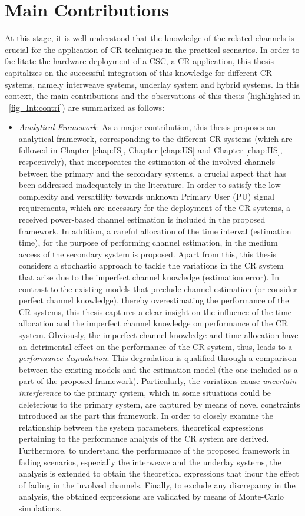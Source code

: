\section{Main Contributions}
At this stage, it is well-understood that the knowledge of the related channels is crucial for the application of CR techniques in the practical scenarios. In order to facilitate the hardware deployment of a CSC, a CR application, this thesis capitalizes on the successful integration of this knowledge for different CR systems, namely interweave systems, underlay system and hybrid systems. In this context, the main contributions and the observations of this thesis (highlighted in \figurename~\ref{fig_Int:contri}) are summarized as follows:
\begin{itemize}
\item \textit{Analytical Framework}: 
As a major contribution, this thesis proposes an analytical framework, corresponding to the different CR systems (which are followed in Chapter \ref{chap:IS}, Chapter \ref{chap:US} and Chapter \ref{chap:HS}, respectively), that incorporates the estimation of the involved channels between the primary and the secondary systems, a crucial aspect that has been addressed inadequately in the literature. In order to satisfy the low complexity and versatility towards unknown Primary User (PU) signal requirements, which are necessary for the deployment of the CR systems, a received power-based channel estimation is included in the proposed framework. In addition, a careful allocation of the time interval (estimation time), for the purpose of performing channel estimation, in the medium access of the secondary system is proposed. Apart from this, this thesis considers a stochastic approach to tackle the variations in the CR system that arise due to the imperfect channel knowledge (estimation error). In contrast to the existing models that preclude channel estimation (or consider perfect channel knowledge), thereby overestimating the performance of the CR systems, this thesis captures a clear insight on the influence of the time allocation and the imperfect channel knowledge on performance of the CR system. Obviously, the imperfect channel knowledge and time allocation have an detrimental effect on the performance of the CR system, thus, leads to a \textit{performance degradation}. This degradation is qualified through a comparison between the existing models and the estimation model (the one included as a part of the proposed framework). Particularly, the variations cause \textit{uncertain interference} to the primary system, which in some situations could be deleterious to the primary system, are captured by means of novel constraints introduced as the part this framework. In order to closely examine the relationship between the system parameters, theoretical expressions pertaining to the performance analysis of the CR system are derived. Furthermore, to understand the performance of the proposed framework in fading scenarios, especially the interweave and the underlay systems, the analysis is extended to obtain the theoretical expressions that incur the effect of fading in the involved channels. Finally, to exclude any discrepancy in the analysis, the obtained expressions are validated by means of Monte-Carlo simulations. 

\end{itemize}
